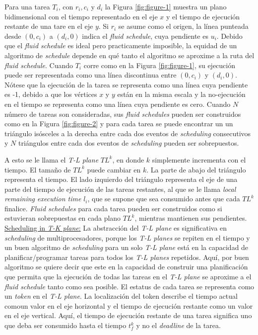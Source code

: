 Para una tarea $T_i$, con $r_i, c_i$ y $d_i$ la Figura \ref{fig:figure-1}  muestra un plano bidimensional con el tiempo representado en el eje $x$ y el tiempo de ejecución restante de una tare en el eje $y$. Si $r_i$ se asume como el origen, la línea punteada desde $(0, c_i)$ a $(d_i, 0)$ indica el \emph{fluid schedule}, cuya pendiente es $u_i$. Debido que el \emph{fluid schedule} es ideal pero practicamente imposible, la equidad de un algoritmo de \emph{schedule} depende en qué tanto el algoritmo se aproxime a la ruta del \emph{fluid schedule}. Cuando $T_i$ corre como en la Figura \ref{fig:figure-1}, su ejecución puede ser representada como una línea discontinua entre $(0, c_i)$ y $(d_i, 0)$. Nótese que la ejecución de la tarea se representa como una línea cuya pendiente es -1, debido a que los vértices $x$ y $y$ están en la misma escala y la no-ejecución en el tiempo se representa como una línea cuya pendiente es cero. Cuando $N$ número de tareas son consideradas, sus \emph{fluid schedules} pueden ser construidos como en la Figura \ref{fig:figure-2} y para cada tarea se puede encontrar un un triángulo isósceles a la derecha entre cada dos eventos de \emph{scheduling} consecutivos y $N$ triángulos entre cada dos eventos de \emph{scheduling} pueden ser sobrepuestos.   


A esto se le llama el \emph{T-L plane} $TL^k$, en donde $k$ simplemente incrementa con el tiempo. El tamaño de $TL^k$ puede cambiar en $k$. La parte de abajo del triángulo representa el tiempo. El lado izquierdo del triángulo representa el eje de una parte del tiempo de ejecución de las tareas restantes, al que se le llama \emph{local remaining execution time} $l_i$, que se supone que sea consumido antes que cada $TL^k$ finalice. \emph{Fluid schedules} para cada tarea pueden ser construidos como si estuvieran sobrepuestas en cada plano $TL^k$, mientras mantienen sus pendientes.
\underline{Scheduling in \emph{T-K plane}:} La abstracción del \emph{T-L plane} es significativa en \emph{scheduling} de multiprocesadores, porque los \emph{T-L planes} se repiten en el tiempo y un buen algoritmo de \emph{scheduling} para un solo \emph{T-L plane} está en la capacidad de planificar/programar tareas para todos los \emph{T-L planes} repetidos. Aquí, por buen algoritmo se quiere decir que este en la capacidad de construir una planificación que permita que la ejecución de todas las tareas en el \emph{T-L plane} se aproxime a el \emph{fluid schedule} tanto como sea posible. El estatus de cada tarea se representa como un \emph{token} en el \emph{T-L plane}. La localización del token describe el tiempo actual comoun valor en el eje horizontal y el tiempo de ejecución restante como un valor en el eje vertical. Aquí, el tiempo de ejecución restante de una tarea significa uno que deba ser consumido hasta el tiempo $t_{f}^{k}$ y no el \emph{deadline} de la tarea.
 
